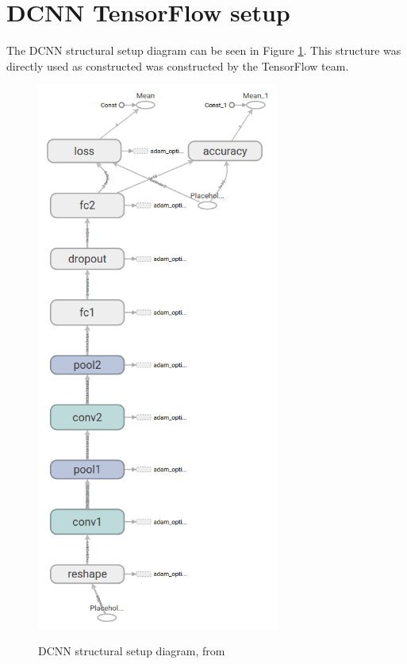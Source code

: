 \section{DCNN TensorFlow setup}
The DCNN structural setup diagram can be seen in Figure \ref{fig:DCNN}. This structure was directly used as constructed was constructed by the TensorFlow team.

\begin{figure}
  \centering
  \includegraphics[width=8cm]{DCNN}\\
  \caption{DCNN structural setup diagram, from \citet{Tensor}}
  \label{fig:DCNN}
\end{figure}